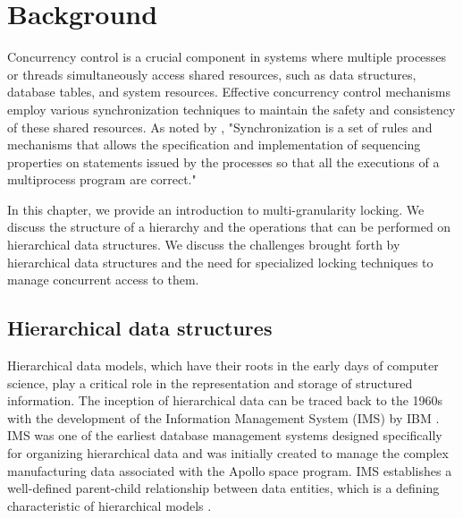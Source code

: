 %

\chapter{Background} \label{chap:background}

\minitoc

Concurrency control is a crucial component in systems where multiple processes or threads simultaneously access shared resources, such as data structures, database tables, and system resources. Effective concurrency control mechanisms employ various synchronization techniques to maintain the safety and consistency of these shared resources. As noted by \citet{DBLP:books/daglib/0030596}, "Synchronization is a set of rules and mechanisms that allows the specification and implementation of sequencing properties on statements issued by the processes so that all the executions of a multiprocess program are correct."

In this chapter, we provide an introduction to multi-granularity locking. We discuss the structure of a hierarchy and the operations that can be performed on hierarchical data structures. We discuss the challenges brought forth by hierarchical data structures and the need for specialized locking techniques to manage concurrent access to them. 




\section{Hierarchical data structures}

Hierarchical data models, which have their roots in the early days of computer science, play a critical role in the representation and storage of structured information. The inception of hierarchical data can be traced back to the 1960s with the development of the Information Management System (IMS) by IBM \cite{IBMIMS}. IMS was one of the earliest database management systems designed specifically for organizing hierarchical data and was initially created to manage the complex manufacturing data associated with the Apollo space program. IMS establishes a well-defined parent-child relationship between data entities, which is a defining characteristic of hierarchical models \cite{DBLP:books/daglib/0006734}.

